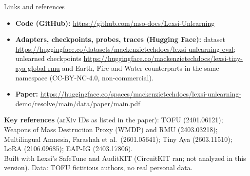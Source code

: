 \documentclass[aspectratio=169,11pt,usepdftitle=false]{beamer}
\begin{document}
\begin{frame}{Links and references}
\small
\begin{itemize}
\item \textbf{Code (GitHub):} \url{https://github.com/mso-docs/Lexsi-Unlearning}
\item \textbf{Adapters, checkpoints, probes, traces (Hugging Face):} dataset \url{https://huggingface.co/datasets/mackenzietechdocs/lexsi-unlearning-eval}; unlearned checkpoints \url{https://huggingface.co/mackenzietechdocs/lexsi-tiny-aya-global-rmu} and Earth, Fire and Water counterparts in the same namespace (CC-BY-NC-4.0, non-commercial).
\item \textbf{Paper:} \url{https://huggingface.co/spaces/mackenzietechdocs/lexsi-unlearning-demo/resolve/main/data/paper/main.pdf}
\end{itemize}
\vspace{4pt}
\scriptsize
\textbf{Key references} (arXiv IDs as listed in the paper):
TOFU (2401.06121); Weapons of Mass Destruction Proxy (WMDP) and RMU (2403.03218); Multilingual Amnesia, Farashah et al.\ (2601.05641); Tiny Aya (2603.11510); LoRA (2106.09685); EAP-IG (2403.17806).\\[4pt]
Built with Lexsi's SafeTune and AuditKIT (CircuitKIT ran; not analyzed in this version). Data: TOFU fictitious authors, no real personal data.
\end{frame}
\end{document}
